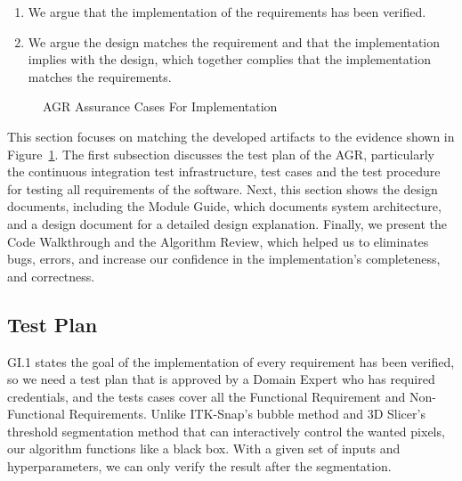 \begin{enumerate}
  \item We argue that the implementation of the requirements has been verified.
  \item We argue the design matches the requirement and that the implementation implies with the design, which together complies that the implementation matches the requirements.
\end{enumerate}

\begin{figure}[hp]
    \centering
    \caption[AGR Assurance Cases For Implementation]{AGR Assurance Cases For Implementation}
    \label{fig_agr_ac_gi}
\end{figure}

This section focuses on matching the developed artifacts to the evidence shown in Figure~\ref{fig_agr_ac_gi}. The first subsection discusses the test plan of the AGR, particularly the continuous integration test infrastructure, test cases and the test procedure for testing all requirements of the software. Next, this section shows the design documents, including the Module Guide, which documents system architecture, and a design document for a detailed design explanation. Finally, we present the Code Walkthrough and the Algorithm Review, which helped us to eliminates bugs, errors, and increase our confidence in the implementation's completeness, and correctness.

\subsection{Test Plan}

GI.1 states the goal of the implementation of every requirement has been verified, so we need a test plan that is approved by a Domain Expert who has required credentials,  and the tests cases cover all the Functional Requirement and Non-Functional Requirements. Unlike ITK-Snap's bubble method and 3D Slicer's threshold segmentation method that can interactively control the wanted pixels, our algorithm functions like a black box. With a given set of inputs and hyperparameters, we can only verify the result after the segmentation.

